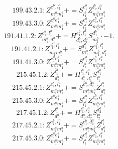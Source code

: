 \documentclass[letterpaper,10pt,fleqn,leqno,onecolumn]{article}
\begin{document}
\begin{equation} \;\;\;\;\;\;  199.43.2.1: Z^{e_{1}^{b},l_{1}^{a}}_{m_{1}^{a}m_{1}^{b}}+=S^{e_{1}^{b}}_{l_{1}^{b}}Z^{l_{1}^{b},l_{1}^{a}}_{m_{1}^{a}m_{1}^{b}} \end{equation}
\begin{equation} \;\;\;\;\;\;  199.43.3.0: Z^{e_{1}^{a}e_{1}^{b}}_{m_{1}^{a}m_{1}^{b}}+=S^{e_{1}^{a}}_{l_{1}^{a}}Z^{e_{1}^{b},l_{1}^{a}}_{m_{1}^{a}m_{1}^{b}} \end{equation}
\begin{equation} \;\;\;\;\;\;  191.41.1.2: Z^{e_{1}^{b},l_{1}^{a}}_{m_{1}^{b},d_{1}^{a}}+=H^{e_{1}^{b},l_{1}^{a}}_{d_{1}^{b},d_{1}^{a}}S^{d_{1}^{b}}_{m_{1}^{b}}\cdot -1. \end{equation}
\begin{equation} \;\;\;\;\;\;  191.41.2.1: Z^{e_{1}^{b},l_{1}^{a}}_{m_{1}^{a}m_{1}^{b}}+=S^{d_{1}^{a}}_{m_{1}^{a}}Z^{e_{1}^{b},l_{1}^{a}}_{m_{1}^{b},d_{1}^{a}} \end{equation}
\begin{equation} \;\;\;\;\;\;  191.41.3.0: Z^{e_{1}^{a}e_{1}^{b}}_{m_{1}^{a}m_{1}^{b}}+=S^{e_{1}^{a}}_{l_{1}^{a}}Z^{e_{1}^{b},l_{1}^{a}}_{m_{1}^{a}m_{1}^{b}} \end{equation}
\begin{equation} \;\;\;\;\;\;  215.45.1.2: Z^{l_{1}^{a}}_{d_{1}^{a}}+=H^{l_{1}^{b},l_{1}^{a}}_{d_{1}^{b},d_{1}^{a}}S^{d_{1}^{b}}_{l_{1}^{b}} \end{equation}
\begin{equation} \;\;\;\;\;\;  215.45.2.1: Z^{e_{1}^{b},l_{1}^{a}}_{m_{1}^{a}m_{1}^{b}}+=S^{e_{1}^{b},d_{1}^{a}}_{m_{1}^{a}m_{1}^{b}}Z^{l_{1}^{a}}_{d_{1}^{a}} \end{equation}
\begin{equation} \;\;\;\;\;\;  215.45.3.0: Z^{e_{1}^{a}e_{1}^{b}}_{m_{1}^{a}m_{1}^{b}}+=S^{e_{1}^{a}}_{l_{1}^{a}}Z^{e_{1}^{b},l_{1}^{a}}_{m_{1}^{a}m_{1}^{b}} \end{equation}
\begin{equation} \;\;\;\;\;\;  217.45.1.2: Z^{l_{1}^{a}}_{d_{1}^{a}}+=H^{l_{1}^{a},l_{2}^{a}}_{d_{1}^{a},d_{2}^{a}}S^{d_{2}^{a}}_{l_{2}^{a}} \end{equation}
\begin{equation} \;\;\;\;\;\;  217.45.2.1: Z^{e_{1}^{b},l_{1}^{a}}_{m_{1}^{a}m_{1}^{b}}+=S^{e_{1}^{b},d_{1}^{a}}_{m_{1}^{a}m_{1}^{b}}Z^{l_{1}^{a}}_{d_{1}^{a}} \end{equation}
\begin{equation} \;\;\;\;\;\;  217.45.3.0: Z^{e_{1}^{a}e_{1}^{b}}_{m_{1}^{a}m_{1}^{b}}+=S^{e_{1}^{a}}_{l_{1}^{a}}Z^{e_{1}^{b},l_{1}^{a}}_{m_{1}^{a}m_{1}^{b}} \end{equation}
\end{document}
